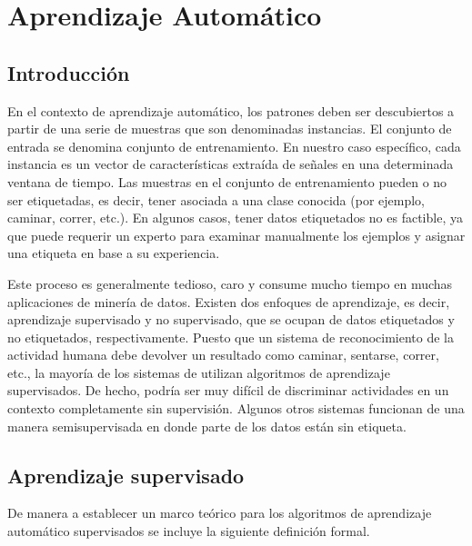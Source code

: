
\chapter{Aprendizaje Automático}
\label{chap:Aprendizaje-Automatico}

\section{Introducción}
En el contexto de aprendizaje automático, los patrones deben ser descubiertos a partir de una serie de muestras que son denominadas instancias. El conjunto de entrada se denomina conjunto de entrenamiento. En nuestro caso específico, cada instancia es un vector de características extraída de señales en una determinada ventana de tiempo. Las muestras en el conjunto de entrenamiento pueden o no ser etiquetadas, es decir, tener asociada a una clase conocida (por ejemplo, caminar, correr, etc.). En algunos casos, tener datos etiquetados no es factible, ya que puede requerir un experto para examinar manualmente los ejemplos y asignar una etiqueta en base a su experiencia.

Este proceso es generalmente tedioso, caro y consume mucho tiempo en muchas aplicaciones de minería de datos. Existen dos enfoques de aprendizaje, es decir, aprendizaje supervisado y no supervisado, que se ocupan de datos etiquetados y no etiquetados, respectivamente. Puesto que un sistema de reconocimiento de la actividad humana debe devolver un resultado como caminar, sentarse, correr, etc., la mayoría de los sistemas de  utilizan algoritmos de aprendizaje supervisados. De hecho, podría ser muy difícil de discriminar actividades en un contexto completamente sin supervisión. Algunos otros sistemas funcionan de una manera semisupervisada en donde parte de los datos están sin etiqueta.

\section{Aprendizaje supervisado}
\label{sec3:aprendizaje}De manera a establecer un marco teórico para los algoritmos de aprendizaje automático supervisados \cite{Rajaraman2011} se incluye la siguiente definición formal.

